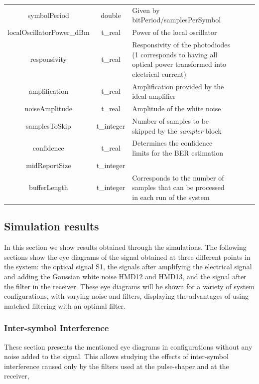 \begin{table}[H]
\begin{tabular}{|c|c|p{70mm}|ccp{70mm}}
		symbolPeriod & double & Given by bitPeriod/samplesPerSymbol &    \\ \cline{1-3}
		localOscillatorPower\_dBm & t\_real & Power of the local oscillator &    \\ \cline{1-3}
		responsivity & t\_real & Responsivity of the photodiodes (1 corresponds to having all optical power transformed into electrical current) &    \\ \cline{1-3}
		amplification & t\_real & Amplification provided by the ideal amplifier &    \\ \cline{1-3}
		noiseAmplitude & t\_real & Amplitude of the white noise &    \\ \cline{1-3}
		samplesToSkip & t\_integer & Number of samples to be skipped by the \textit{sampler} block &    \\ \cline{1-3}
		confidence & t\_real & Determines the confidence limits for the BER estimation &    \\ \cline{1-3}
		midReportSize & t\_integer &  &    \\ \cline{1-3}
		bufferLength & t\_integer & Corresponds to the number of samples that can be processed in each run of the system &    \\ \cline{1-3}
		\end{tabular}
		\label{table:in_par}
		\end{table}

\subsection*{Simulation results}

In this section we show results obtained through the simulations. The
following sections show the eye diagrams of the signal obtained at three
different points in the system: the optical signal S1, the signals after
amplifying the electrical signal and adding the Gaussian white noise HMD12 and
HMD13, and the signal after the filter in the receiver. These eye diagrams will
be shown for a variety of system configurations, with varying noise and
filters, displaying the advantages of using matched filtering with an optimal
filter.

\subsubsection{Inter-symbol Interference}

These section presents the mentioned eye diagrams in configurations without any
noise added to the signal. This allows studying the effects of inter-symbol
interference caused only by the filters used at the pulse-shaper and at the
receiver, 

